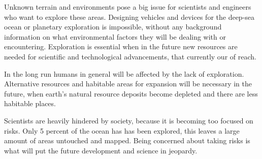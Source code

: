 Unknown terrain and environments pose a big issue for scientists and engineers who want to explore these areas. Designing vehicles and devices for the deep-sea ocean or planetary exploration is impossible, without any background information on what environmental factors they will be dealing with or encountering. Exploration is essential when in the future new resources are needed for scientific and technological advancements, that currently our of reach.

In the long run humans in general will be affected by the lack of exploration. Alternative resources and habitable areas for expansion will be necessary in the future, when earth's natural resource deposits become depleted and there are less habitable places. 

Scientists are heavily hindered by society, because it is becoming too focused on risks. Only 5 percent of the ocean has has been explored, this leaves a large amount of areas untouched and mapped. Being concerned about taking risks is what will put the future development and science in jeopardy.\cite{risksandexplo} 
